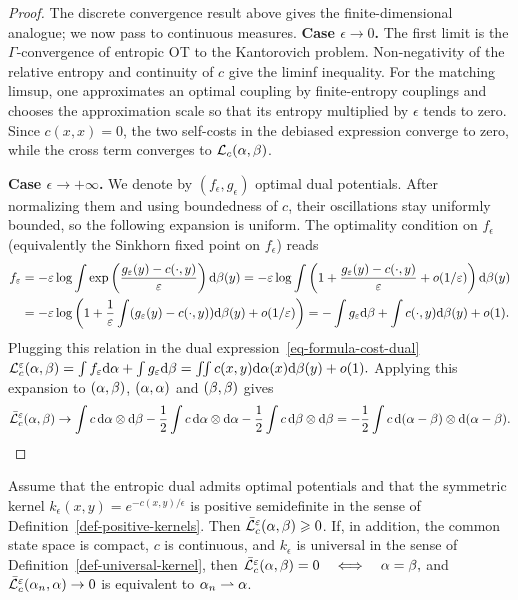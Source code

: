 \begin{proof}
The discrete convergence result above gives the finite-dimensional analogue; we now pass to continuous measures.
\textbf{Case $\epsilon \rightarrow 0$.}
The first limit is the $\Gamma$-convergence of entropic OT to the Kantorovich problem. Non-negativity of the relative entropy and continuity of $c$ give the liminf inequality. For the matching limsup, one approximates an optimal coupling by finite-entropy couplings and chooses the approximation scale so that its entropy multiplied by $\epsilon$ tends to zero. Since $c(x,x)=0$, the two self-costs in the debiased expression converge to zero, while the cross term converges to $\mathcal{L}_c(\alpha,\beta)$.

\textbf{Case $\epsilon \rightarrow +\infty$.} We denote by $(f_\epsilon,g_\epsilon)$ optimal dual potentials. After normalizing them and using boundedness of $c$, their oscillations stay uniformly bounded, so the following expansion is uniform. The optimality condition on $f_\epsilon$ (equivalently the Sinkhorn fixed point on $f_\epsilon$) reads
\begin{align*}
f_\varepsilon &= -\varepsilon \log \int \exp\left(  \frac{g_\varepsilon(y) - c(\cdot,y)}{\varepsilon}  \right) \mathrm{d} \beta(y)
=	-\varepsilon \log \int \left(  1 + \frac{g_\varepsilon(y) - c(\cdot,y)}{\varepsilon} + o(1/\varepsilon)  \right) \mathrm{d} \beta(y) \\
&=	-\varepsilon \log\left( 1+\frac{1}{\varepsilon}\int (g_\varepsilon(y)-c(\cdot,y))\mathrm{d}\beta(y)+o(1/\varepsilon) \right)
= - \int g_\varepsilon \mathrm{d}\beta + \int c(\cdot,y) \mathrm{d} \beta(y) + o(1).
\end{align*}
Plugging this relation in the dual expression~\eqref{eq-formula-cost-dual}
\(\mathcal{L}_c^\varepsilon(\alpha,\beta) = \int f_\varepsilon \mathrm{d}\alpha + \int g_\varepsilon \mathrm{d} \beta = \iint c(x,y) \mathrm{d}\alpha(x)\mathrm{d}\beta(y) + o(1).\)
Applying this expansion to $(\alpha,\beta)$, $(\alpha,\alpha)$ and $(\beta,\beta)$ gives
\[
\bar{\mathcal{L}}_c^\varepsilon(\alpha,\beta)
\to
\int c\,\mathrm{d}\alpha\otimes\mathrm{d}\beta
-\frac12\int c\,\mathrm{d}\alpha\otimes\mathrm{d}\alpha
-\frac12\int c\,\mathrm{d}\beta\otimes\mathrm{d}\beta
=
-\frac12\int c\,\mathrm{d}(\alpha-\beta)\otimes\mathrm{d}(\alpha-\beta).
\]
\end{proof}
\begin{prop}\label{prop-sinkhorn-positive}
Assume that the entropic dual admits optimal potentials and that the symmetric kernel $k_\epsilon(x,y)=e^{-c(x,y)/\epsilon}$ is positive semidefinite in the sense of Definition~\ref{def-positive-kernels}. Then $\bar{\mathcal{L}}_c^\varepsilon(\alpha,\beta)\geqslant0$.
If, in addition, the common state space is compact, $c$ is continuous, and $k_\epsilon$ is universal in the sense of Definition~\ref{def-universal-kernel}, then
\(\bar{\mathcal{L}}_c^\varepsilon(\alpha,\beta)=0 \quad\Longleftrightarrow\quad \alpha=\beta,\)
and $\bar{\mathcal{L}}_c^\varepsilon(\alpha_n,\alpha)\to0$ is equivalent to $\alpha_n\rightharpoonup\alpha$.
\end{prop}
